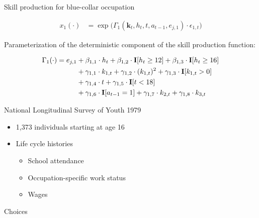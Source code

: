 \begin{frame}{Skill production for blue-collar occupation}

\begin{align*}
	x_{1}(\cdot) & = \exp \big( \Gamma_{1}(\bm{k}_t,  h_t, t, a_{t-1}, e_{j,1}) \cdot \epsilon_{1,t} \big)
\end{align*}

Parameterization of the deterministic component of the skill production function:\vspace{-0.5cm}

\begin{align*}
     \Gamma_1(\cdot) = e_{j,1} & + \beta_{1,1} \cdot h_t + \beta_{1, 2} \cdot {\textbf{I}}[h_t \geq 12] + \beta_{1,3} \cdot {\textbf{I}}[h_t\geq 16]\\
                                   & + \gamma_{1, 1} \cdot  k_{1,t} + \gamma_{1,2} \cdot  (k_{1,t})^2 + \gamma_{1,3} \cdot  {\textbf{I}}[k_{1,t} > 0] \\
                                 & + \gamma_{1,4} \cdot  t + \gamma_{1,5} \cdot {\textbf{I}}[t < 18]\\
                                   & + \gamma_{1,6} \cdot {\textbf{I}}[a_{t-1} = 1] + \gamma_{1,7} \cdot  k_{2,t} + \gamma_{1,8} \cdot  k_{3,t}
\end{align*}
\end{frame}
\begin{frame}{National Longitudinal Survey of Youth 1979}\vspace{0.25cm}

	\begin{itemize}\setlength\itemsep{1em}
	\item 1,373 individuals starting at age 16
	\item Life cycle histories\medskip
	\begin{itemize}\setlength\itemsep{1em}
		\item School attendance
		\item Occupation-specific work status
		\item Wages
	\end{itemize}
\end{itemize}
\end{frame}
\begin{frame}{Choices}
  \begin{figure}
  \end{figure}
\end{frame}

